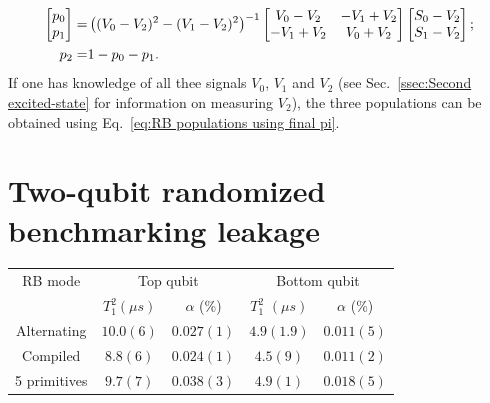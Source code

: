       \begin{align}
        \begin{bmatrix}
          p_0 \\
          p_1
        \end{bmatrix}
        = &
        \left((V_0-V_2)^2 - (V_1 - V_2)^2\right)^{-1}
        \begin{bmatrix}
          V_0 - V_2 & -V_1 + V_2 \\
          -V_1 + V_2 & V_0 + V_2
        \end{bmatrix}
        \begin{bmatrix}
          S_0 - V_2 \\
          S_1 - V_2
        \end{bmatrix}; \notag\\
        p_2 = & 1 - p_0 - p_1.
        \label{eq:RB populations using final pi}
      \end{align}
      If one has knowledge of all thee signals $V_0$, $V_1$ and $V_2$ (see Sec.~\ref{ssec:Second excited-state} for information on measuring $V_2$), the three populations can be obtained using Eq.~\ref{eq:RB populations using final pi}.
      \newpage
  \section{Two-qubit randomized benchmarking leakage}
    \label{sec:Two-qubit randomized benchmarking leakage}
        \begin{table}[h]
          \begin{tabular}{c c c c c}
            \toprule
            RB mode & \multicolumn{2}{c}{Top qubit} & \multicolumn{2}{c}{Bottom qubit} \\
            \cmidrule(lr){2-3}
            \cmidrule(lr){4-5}
            & $T_1^2 (\mu s)$ & $\alpha$ (\%) & $T_1^2$ $(\mu s)$ & $\alpha$ (\%) \\
            \midrule
            Alternating  & $10.0(6)$    & $0.027(1)$ & $4.9(1.9)$  & $0.011(5)$\\
            Compiled     & $8.8(6)$    & $0.024(1)$  & $4.5(9)$ & $0.011(2)$\\
            5 primitives &$9.7(7)$    & $0.038(3)$  & $4.9(1)$  & $0.018(5)$\\
            \bottomrule
          \end{tabular}
        \end{table}


